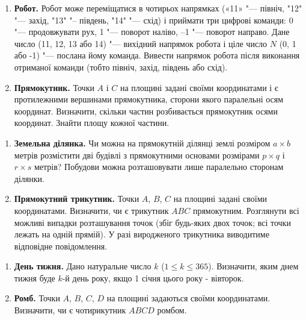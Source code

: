 \documentclass{scrreprt}
\begin{document}
	{\large
		\begin{enumerate}
			\item \textbf{Робот.} Робот може переміщатися в чотирьох напрямках («11» "--- північ, "12" "--- захід, "13" "-- південь, "14" "--- схід) і приймати три цифрові команди: 0 "--- продовжувати рух, 1 "--- поворот наліво, –1 "--- поворот направо. Дане число (11, 12, 13 або 14) "--- вихідний напрямок робота і ціле число $N $ (0, 1 або -1) "--- послана йому команда. Вивести напрямок робота після виконання отриманої команди (тобто північ, захід, південь або схід).
			\item \textbf{Прямокутник.} Точки $A$ і $C$ на площині задані своїми координатами і є про\-ти\-леж\-ни\-ми вершинами прямокутника, сторони якого паралельні осям координат. Визначити, скільки частин розбивається прямокутник осями координат. Знайти площу кожної частини.
		\end{enumerate}
	}
	
	\newpage
	
	
	{\large
		\begin{enumerate}
			\item \textbf{Земельна ділянка.} Чи можна на прямокутній ділянці землі розміром $a\times b$ метрів розмістити дві будівлі з прямокутними основами розмірами $p\times q$ і $r\times s$ метрів? Побудови можна розташовувати лише паралельно сторонам ділянки.
			\item \textbf{Прямокутний трикутник.} Точки $A$, $B$, $C$ на площині задані своїми координатами. Визначити, чи є трикутник $ABC$ прямокутним. Розглянути всі можливі випадки розташування точок (збіг будь-яких двох точок; всі точки лежать на одній прямій). У разі виродженого трикутника виводитиме відповідне повідомлення.
		\end{enumerate}
	}
	
	\vspace{2cm}
	
	
	{\large
		\begin{enumerate}
			\item \textbf{День тижня.} Дано натуральне число $k$ ($1\leqslant k\leqslant 365$). Визначити, яким днем тижня буде $k$-й день року, якщо 1 січня цього року - вівторок.
			\item \textbf{Ромб.} Точки $A$, $B$, $C$, $D$ на площині задаються своїми координатами. Визначити, чи є чотирикутник $ABCD$ ромбом.
		\end{enumerate}
	}
	
\end{document}
